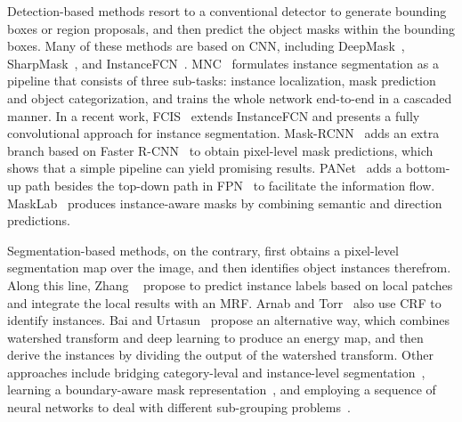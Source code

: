 \documentclass[10pt,twocolumn,letterpaper]{article}
\begin{document}
Detection-based methods resort to a conventional detector to generate bounding
boxes or region proposals, and then predict the object masks within the
bounding boxes.
Many of these methods are based on CNN, including
DeepMask~\cite{pinheiro2015learning},
SharpMask~\cite{pinheiro2016learning},
and InstanceFCN~\cite{dai2016instance}.
MNC~\cite{dai2016mnc} formulates instance segmentation as a pipeline
that consists of three sub-tasks: instance localization, mask
prediction and object categorization, and trains the whole network end-to-end
in a cascaded manner.
In a recent work, FCIS~\cite{li2017fully} extends InstanceFCN and presents a
fully convolutional approach for instance segmentation.
Mask-RCNN~\cite{he2017mask} adds an extra branch based on Faster
R-CNN~\cite{ren2015faster} to obtain pixel-level mask predictions,
which shows that a simple pipeline can yield promising results.
PANet~\cite{liu2018path} adds a bottom-up path besides the top-down path in
FPN~\cite{lin2017feature} to facilitate the information flow.
MaskLab~\cite{chen2018masklab} produces instance-aware masks by combining
semantic and direction predictions.

Segmentation-based methods, on the contrary, first obtains a pixel-level
segmentation map over the image, and then identifies object instances therefrom.
Along this line,
Zhang \etal~\cite{zhang2015monocular, zhang2016instance}
propose to predict instance labels based on local patches and integrate
the local results with an MRF.
Arnab and Torr~\cite{arnab2016bottom} also use CRF to identify instances.
Bai and Urtasun~\cite{bai2017deep} propose an alternative way, which
combines watershed transform and deep learning to produce an energy map,
and then derive the instances by dividing the output of the watershed transform.
Other approaches include bridging category-leval and instance-level
segmentation~\cite{wu2016bridging}, learning a boundary-aware mask
representation~\cite{hayder2017boundary}, and employing a sequence of
neural networks to deal with different sub-grouping problems~\cite{liu2017sgn}.
\end{document}
